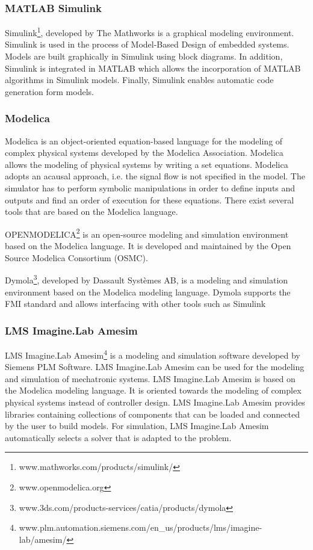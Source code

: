 
\subsubsection{MATLAB Simulink}
Simulink\footnote{www.mathworks.com/products/simulink/}, developed by The Mathworks is a graphical modeling environment. Simulink is used in the  process of Model-Based Design of embedded systems. Models are built graphically in Simulink using block diagrams. In addition, Simulink is integrated in MATLAB which allows the incorporation of MATLAB algorithms in Simulink models. Finally, Simulink enables automatic code generation form models.

\subsubsection{Modelica}
Modelica is an object-oriented equation-based language for the modeling of complex physical systems developed by the Modelica Association. Modelica allows the modeling of physical systems by writing a set equations. Modelica adopts an acausal approach, i.e. the signal flow is not specified in the model. The simulator has to perform symbolic manipulations in order to define inputs and outputs and find an order of execution for these equations. There exist several tools that are based on the Modelica language.

OPENMODELICA\footnote{www.openmodelica.org} is an open-source modeling and simulation environment based on the Modelica language. It is developed and maintained by the Open Source Modelica Consortium (OSMC).

Dymola\footnote{www.3ds.com/products-services/catia/products/dymola}, developed by Dassault Syst\`emes AB, is a modeling and simulation environment based on the Modelica modeling language. Dymola supports the FMI standard and allows interfacing with other tools such as Simulink

\subsubsection{LMS Imagine.Lab Amesim}
LMS Imagine.Lab Amesim\footnote{www.plm.automation.siemens.com/en\_us/products/lms/imagine-lab/amesim/} is a modeling and simulation software developed by Siemens PLM Software. LMS Imagine.Lab Amesim can be used for the modeling and simulation of mechatronic systems. LMS Imagine.Lab Amesim is based on the Modelica modeling language. It is oriented towards the modeling of complex physical systems instead of controller design. LMS Imagine.Lab Amesim provides libraries containing collections of components that can be loaded and connected by the user to build models. For simulation, LMS Imagine.Lab Amesim automatically selects a solver that is adapted to the problem.

